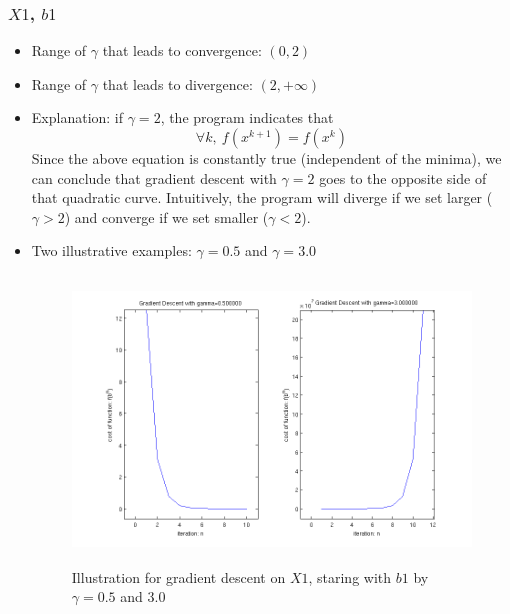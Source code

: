 \documentclass[11pt,a4paper]{article}
\begin{document}
\subsubsection{$X1$, $b1$}
\begin{itemize}
    \item Range of $\gamma$ that leads to convergence: $(0,2)$
    \item Range of $\gamma$ that leads to divergence: $(2,+\infty)$
    \item Explanation: if $\gamma = 2$, the program indicates that 
        $$ \forall k,\ f(x^{k+1}) = f(x^{k})$$ 
        Since the above equation is constantly true (independent of the
        minima), we can conclude that gradient descent with $\gamma = 2$ goes 
        to the opposite side of that quadratic curve. Intuitively, the program 
        will diverge if we set larger ($\gamma>2$) and converge if we set smaller
        ($\gamma<2$).   
    \item Two illustrative examples: $\gamma = 0.5$ and $\gamma = 3.0$
        \begin{figure}[h]
            \centering
            \includegraphics[width=6in,height=3in]{../ps1_matlab/1.png}
            \caption{Illustration for gradient descent on $X1$, staring with
                $b1$ by $\gamma = 0.5$ and $3.0$}
        \end{figure}
\end{itemize}

\newpage
\end{document}
